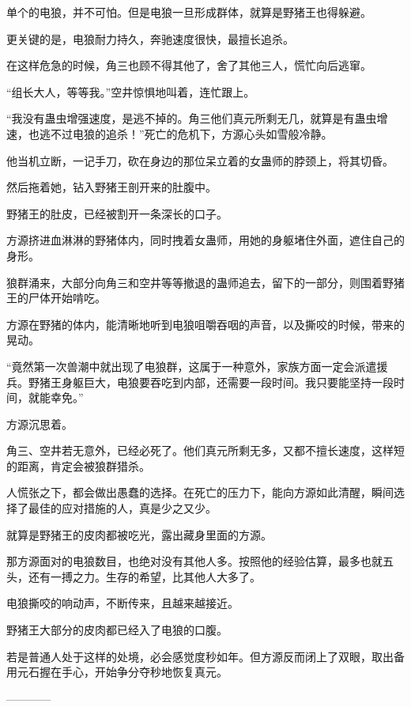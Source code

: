 \begin{this_body}
单个的电狼，并不可怕。但是电狼一旦形成群体，就算是野猪王也得躲避。

更关键的是，电狼耐力持久，奔驰速度很快，最擅长追杀。

在这样危急的时候，角三也顾不得其他了，舍了其他三人，慌忙向后逃窜。

“组长大人，等等我。”空井惊惧地叫着，连忙跟上。

“我没有蛊虫增强速度，是逃不掉的。角三他们真元所剩无几，就算是有蛊虫增速，也逃不过电狼的追杀！”死亡的危机下，方源心头如雪般冷静。

他当机立断，一记手刀，砍在身边的那位呆立着的女蛊师的脖颈上，将其切昏。

然后拖着她，钻入野猪王剖开来的肚腹中。

野猪王的肚皮，已经被割开一条深长的口子。

方源挤进血淋淋的野猪体内，同时拽着女蛊师，用她的身躯堵住外面，遮住自己的身形。

狼群涌来，大部分向角三和空井等等撤退的蛊师追去，留下的一部分，则围着野猪王的尸体开始啃吃。

方源在野猪的体内，能清晰地听到电狼咀嚼吞咽的声音，以及撕咬的时候，带来的晃动。

“竟然第一次兽潮中就出现了电狼群，这属于一种意外，家族方面一定会派遣援兵。野猪王身躯巨大，电狼要吞吃到内部，还需要一段时间。我只要能坚持一段时间，就能幸免。”

方源沉思着。

角三、空井若无意外，已经必死了。他们真元所剩无多，又都不擅长速度，这样短的距离，肯定会被狼群猎杀。

人慌张之下，都会做出愚蠢的选择。在死亡的压力下，能向方源如此清醒，瞬间选择了最佳的应对措施的人，真是少之又少。

就算是野猪王的皮肉都被吃光，露出藏身里面的方源。

那方源面对的电狼数目，也绝对没有其他人多。按照他的经验估算，最多也就五头，还有一搏之力。生存的希望，比其他人大多了。

电狼撕咬的响动声，不断传来，且越来越接近。

野猪王大部分的皮肉都已经入了电狼的口腹。

若是普通人处于这样的处境，必会感觉度秒如年。但方源反而闭上了双眼，取出备用元石握在手心，开始争分夺秒地恢复真元。

------------

\end{this_body}

